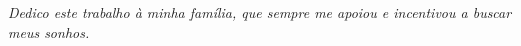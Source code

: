 \begin{dedicatoria}
   \vspace*{\fill}
   \centering
   \noindent

   \textit{Dedico este trabalho à minha família, que sempre me apoiou e incentivou a buscar meus sonhos.}
   \vspace*{\fill}
\end{dedicatoria}
